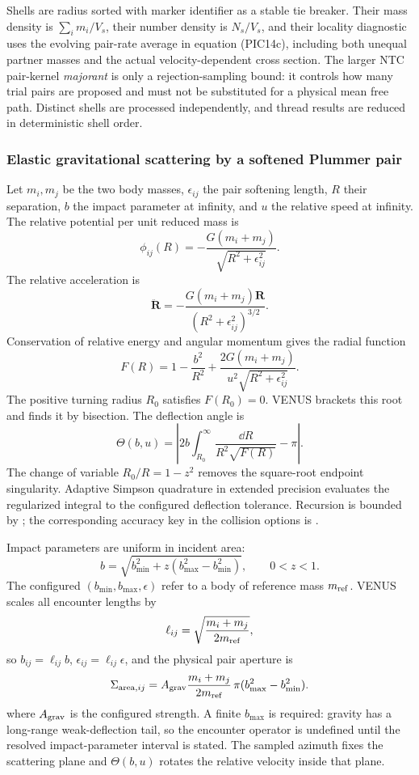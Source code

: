 Shells are radius sorted with marker identifier as a stable tie breaker.
Their mass density is \(\sum_i m_i/V_s\), their number density is \(N_s/V_s\),
and their locality diagnostic uses the evolving pair-rate average in equation
(PIC14c), including both unequal partner masses and the actual
velocity-dependent cross section.  The larger NTC pair-kernel
\emph{majorant} is only a rejection-sampling bound: it controls how many trial
pairs are proposed and must not be substituted for a physical mean free path.
Distinct shells are processed independently, and thread results are reduced
in deterministic shell order.

\subsubsection{Elastic gravitational scattering by a softened Plummer pair}
\label{sec:wpic-plummer-scattering}

Let \(m_i,m_j\) be the two body masses, \(\epsilon_{ij}\) the pair softening
length, \(R\) their separation, \(b\) the
impact parameter at infinity, and \(u\) the relative speed at infinity.  The
relative potential per unit reduced mass is
\[
 \phi_{ij}(R)=-\frac{G(m_i+m_j)}
 {\sqrt{R^2+\epsilon_{ij}^2}}.
\]
The relative acceleration is
\[
 \ddot{\bm R}
 =-\frac{G(m_i+m_j)\bm R}
 {(R^2+\epsilon_{ij}^2)^{3/2}}.
\]
Conservation of relative energy and angular momentum gives the radial
function
\[
 F(R)=1-\frac{b^2}{R^2}
 +\frac{2G(m_i+m_j)}
 {u^2\sqrt{R^2+\epsilon_{ij}^2}}.
\]
The positive turning radius \(R_0\) satisfies \(F(R_0)=0\).  VENUS brackets
this root and finds it by bisection.  The deflection angle is
\[
 \Theta(b,u)
 =\left|2b\int_{R_0}^{\infty}
 \frac{\dd R}{R^2\sqrt{F(R)}}-\pi\right|.
\]
The change of variable \(R_0/R=1-z^2\) removes the square-root endpoint
singularity.  Adaptive Simpson quadrature in extended precision evaluates the
regularized integral to the configured deflection tolerance.  Recursion is
bounded by ; the corresponding
accuracy key in the collision options is
.

Impact parameters are uniform in incident area:
\[
 b=\sqrt{b_{\min}^2+z(b_{\max}^2-b_{\min}^2)},
 \qquad 0<z<1.
\]
The configured \((b_{\min},b_{\max},\epsilon)\) refer to a body of reference
mass \(m_{\rm ref}\).  VENUS scales all encounter lengths by
\[
 \ell_{ij}=\sqrt{\frac{m_i+m_j}{2m_{\rm ref}}},
\]
so \(b_{ij}=\ell_{ij}b\), \(\epsilon_{ij}=\ell_{ij}\epsilon\), and the
physical pair aperture is
\[
 \Sigma_{{\rm area},ij}
 =A_{\rm grav}\frac{m_i+m_j}{2m_{\rm ref}}\,
 \pi(b_{\max}^2-b_{\min}^2).
\]
where \(A_{\rm grav}\) is the configured strength.  A finite \(b_{\max}\) is
required: gravity has a long-range weak-deflection tail, so the encounter
operator is undefined until the resolved impact-parameter interval is stated.
The sampled azimuth fixes the scattering plane and \(\Theta(b,u)\) rotates the
relative velocity inside that plane.

